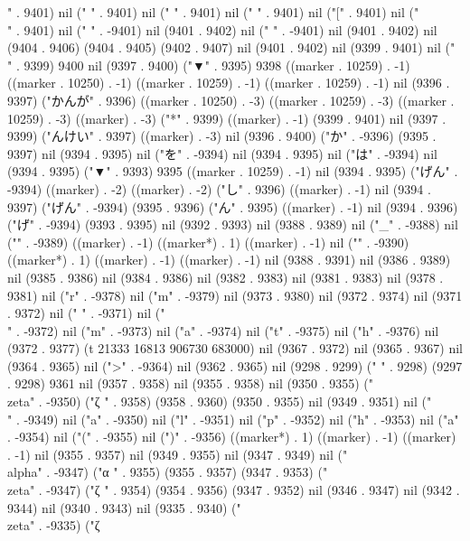 {{" . 9401) nil (" " . 9401) nil (" " . 9401) nil ("
" . 9401) nil ("[" . 9401) nil ("\\" . 9401) nil (" " . -9401) nil (9401 . 9402) nil (" " . -9401) nil (9401 . 9402) nil (9404 . 9406) (9404 . 9405) (9402 . 9407) nil (9401 . 9402) nil (9399 . 9401) nil (" " . 9399) 9400 nil (9397 . 9400) ("▼" . 9395) 9398 ((marker . 10259) . -1) ((marker . 10250) . -1) ((marker . 10259) . -1) ((marker . 10259) . -1) nil (9396 . 9397) ("かんが" . 9396) ((marker . 10250) . -3) ((marker . 10259) . -3) ((marker . 10259) . -3) ((marker) . -3) ("*" . 9399) ((marker) . -1) (9399 . 9401) nil (9397 . 9399) ("んけい" . 9397) ((marker) . -3) nil (9396 . 9400) ("か" . -9396) (9395 . 9397) nil (9394 . 9395) nil ("を" . -9394) nil (9394 . 9395) nil ("は" . -9394) nil (9394 . 9395) ("▼" . 9393) 9395 ((marker . 10259) . -1) nil (9394 . 9395) ("げん" . -9394) ((marker) . -2) ((marker) . -2) ("し" . 9396) ((marker) . -1) nil (9394 . 9397) ("げん" . -9394) (9395 . 9396) ("ん" . 9395) ((marker) . -1) nil (9394 . 9396) ("げ" . -9394) (9393 . 9395) nil (9392 . 9393) nil (9388 . 9389) nil ("_" . -9388) nil ("{" . -9389) ((marker) . -1) ((marker*) . 1) ((marker) . -1) nil ("}" . -9390) ((marker*) . 1) ((marker) . -1) ((marker) . -1) nil (9388 . 9391) nil (9386 . 9389) nil (9385 . 9386) nil (9384 . 9386) nil (9382 . 9383) nil (9381 . 9383) nil (9378 . 9381) nil ("r" . -9378) nil ("m" . -9379) nil (9373 . 9380) nil (9372 . 9374) nil (9371 . 9372) nil (" " . -9371) nil ("\\" . -9372) nil ("m" . -9373) nil ("a" . -9374) nil ("t" . -9375) nil ("h" . -9376) nil (9372 . 9377) (t 21333 16813 906730 683000) nil (9367 . 9372) nil (9365 . 9367) nil (9364 . 9365) nil (">" . -9364) nil (9362 . 9365) nil (9298 . 9299) (" " . 9298) (9297 . 9298) 9361 nil (9357 . 9358) nil (9355 . 9358) nil (9350 . 9355) ("\\zeta" . -9350) ("ζ
" . 9358) (9358 . 9360) (9350 . 9355) nil (9349 . 9351) nil ("\\" . -9349) nil ("a" . -9350) nil ("l" . -9351) nil ("p" . -9352) nil ("h" . -9353) nil ("a" . -9354) nil ("(" . -9355) nil (")" . -9356) ((marker*) . 1) ((marker) . -1) ((marker) . -1) nil (9355 . 9357) nil (9349 . 9355) nil (9347 . 9349) nil ("\\alpha" . -9347) ("α
" . 9355) (9355 . 9357) (9347 . 9353) ("\\zeta" . -9347) ("ζ
" . 9354) (9354 . 9356) (9347 . 9352) nil (9346 . 9347) nil (9342 . 9344) nil (9340 . 9343) nil (9335 . 9340) ("\\zeta" . -9335) ("ζ
}}
